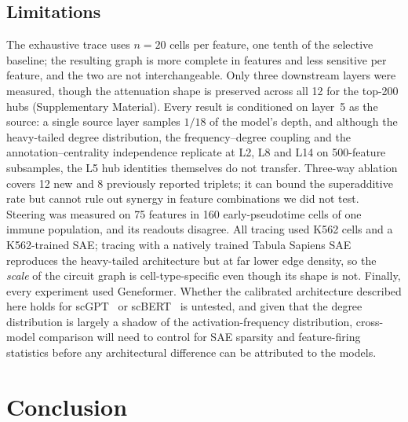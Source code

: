 \documentclass[11pt,onecolumn]{article}
\begin{document}
\subsection{Limitations}

The exhaustive trace uses $n=20$ cells per feature, one tenth of the selective baseline; the resulting graph is more complete in features and less sensitive per feature, and the two are not interchangeable. Only three downstream layers were measured, though the attenuation shape is preserved across all 12 for the top-200 hubs (Supplementary Material). Every result is conditioned on layer~5 as the source: a single source layer samples $1/18$ of the model's depth, and although the heavy-tailed degree distribution, the frequency--degree coupling and the annotation--centrality independence replicate at L2, L8 and L14 on 500-feature subsamples, the L5 hub identities themselves do not transfer. Three-way ablation covers 12 new and 8 previously reported triplets; it can bound the superadditive rate but cannot rule out synergy in feature combinations we did not test. Steering was measured on 75 features in 160 early-pseudotime cells of one immune population, and its readouts disagree. All tracing used K562 cells and a K562-trained SAE; tracing with a natively trained Tabula Sapiens SAE reproduces the heavy-tailed architecture but at far lower edge density, so the \emph{scale} of the circuit graph is cell-type-specific even though its shape is not. Finally, every experiment used Geneformer. Whether the calibrated architecture described here holds for scGPT~\citep{cui2024scgpt} or scBERT~\citep{yang2022scbert} is untested, and given that the degree distribution is largely a shadow of the activation-frequency distribution, cross-model comparison will need to control for SAE sparsity and feature-firing statistics before any architectural difference can be attributed to the models.


\section{Conclusion}
\label{sec:conclusion}
\end{document}
